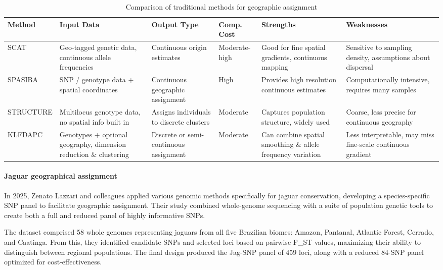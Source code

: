 \documentclass[twocolumn,10pt]{article}
\begin{document}
\begin{table}[t]
\centering
\caption{Comparison of traditional methods for geographic assignment}
\label{tab:traditional_methods}
\small
\begin{tabular}{p{1.8cm}p{2.3cm}p{2cm}p{1.5cm}p{2.5cm}p{2.5cm}}
\hline
\textbf{Method}
  & \textbf{Input Data}
  & \textbf{Output Type}
  & \textbf{Comp. Cost}
  & \textbf{Strengths}
  & \textbf{Weaknesses} \\
\hline
SCAT
  & Geo-tagged genetic data, continuous allele frequencies
  & Continuous origin estimates
  & Moderate-high
  & Good for fine spatial gradients, continuous mapping
  & Sensitive to sampling density, assumptions about dispersal \\
\hline
SPASIBA
  & SNP / genotype data + spatial coordinates
  & Continuous geographic assignment
  & High
  & Provides high resolution continuous estimates
  & Computationally intensive, requires many samples \\
\hline
STRUCTURE
  & Multilocus genotype data, no spatial info built in
  & Assigns individuals to discrete clusters
  & Moderate
  & Captures population structure, widely used
  & Coarse, less precise for continuous geography \\
\hline
KLFDAPC
  & Genotypes + optional geography, dimension reduction \& clustering
  & Discrete or semi-continuous assignment
  & Moderate
  & Can combine spatial smoothing \& allele frequency variation
  & Less interpretable, may miss fine-scale continuous gradient \\
\hline
\end{tabular}
\end{table}

\paragraph{Jaguar geographical assignment}

In 2025, Zenato Lazzari and colleagues \citep{lazzari2025development} applied various genomic
methods specifically for jaguar conservation, developing a species-specific SNP panel to facilitate
geographic assignment. Their study combined whole-genome sequencing with a suite of population
genetic tools to create both a full and reduced panel of highly informative SNPs.

The dataset comprised 58 whole genomes representing jaguars from all five Brazilian biomes: Amazon,
Pantanal, Atlantic Forest, Cerrado, and Caatinga. From this, they identified candidate SNPs and
selected loci based on pairwise F\_ST values, maximizing their ability to distinguish between
regional populations. The final design produced the Jag-SNP panel of 459 loci, along with a reduced
84-SNP panel optimized for cost-effectiveness.
\end{document}
